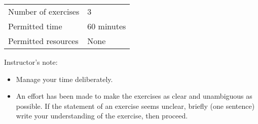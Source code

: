 \begin{center}
\begin{tabular}{l@{ : }l}
Number of exercises	&	3			\\
Permitted time		&	60 minutes	\\
Permitted resources	&	None
\end{tabular}
\end{center}
\vspace{.25in}
\noindent{}Instructor's note:
\begin{itemize}
\item Manage your time deliberately.
\item An effort has been made to make the exercises as clear and unambiguous as possible. If the statement of an exercise seems unclear, briefly (one sentence) write your understanding of the exercise, then proceed.
\end{itemize}